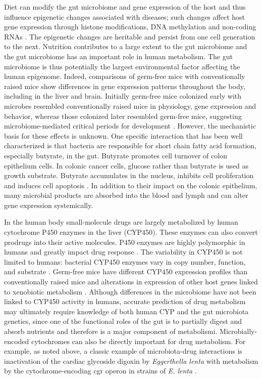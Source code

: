 Diet can modify the gut microbiome and gene expression of the host and thus influence epigenetic changes associated with diseases; such changes affect host gene expression through histone modifications, DNA methylation and non-coding RNAs \cite{RN4139}. The epigenetic changes are heritable and persist from one cell generation to the next. Nutrition contributes to a large extent to the gut microbiome and the gut microbiome has an important role in human metabolism. The gut microbiome is thus potentially the largest environmental factor affecting the human epigenome. Indeed, comparisons of germ-free mice with conventionally raised mice show differences in gene expression patterns throughout the body, including in the liver and brain. Initially germ-free mice colonized early with microbes resembled conventionally raised mice in physiology, gene expression and behavior, whereas those colonized later resembled germ-free mice, suggesting microbiome-mediated critical periods for development \cite{RN4140}. However, the mechanistic basis for these effects is unknown. One specific interaction that has been well characterized is that bacteria are responsible for short chain fatty acid formation, especially butyrate, in the gut. Butyrate promotes cell turnover of colon epithelium cells. In colonic cancer cells, glucose rather than butyrate is used as growth substrate. Butyrate accumulates in the nucleus, inhibits cell proliferation and induces cell apoptosis \cite{RN4141}. In addition to their impact on the colonic epithelium, many microbial products are absorbed into the blood and lymph and can alter gene expression systemically. 

In the human body small-molecule drugs are largely metabolized by human cytochrome P450 enzymes in the liver (CYP450). These enzymes can also convert prodrugs into their active molecules. P450 enzymes are highly polymorphic in humans and greatly impact drug response \cite{RN4142}. The variability in CYP450 is not limited to humans: bacterial CYP450 enzymes vary in copy number, function, and substrate \cite{RN4143}. Germ-free mice have different CYP450 expression profiles than conventionally raised mice and alterations in expression of other host genes linked to xenobiotic metabolism \cite{RN4144}. Although differences in the microbiome have not been linked to CYP450 activity in humans, accurate prediction of drug metabolism may ultimately require knowledge of both human CYP and the gut microbiota genetics, since one of the functional roles of the gut is to partially digest and absorb nutrients and therefore is a major component of metabolismi. Microbially-encoded cytochromes can also be directly important for drug metabolism. For example, as noted above, a classic example of microbiota-drug interactions is inactivation of the cardiac glycoside digoxin by \textit{Eggerthella lenta} \cite{RN4099} with metabolism by  the cytochrome-encoding cgr operon in strains of \textit{E. lenta} \cite{RN4146}. 

